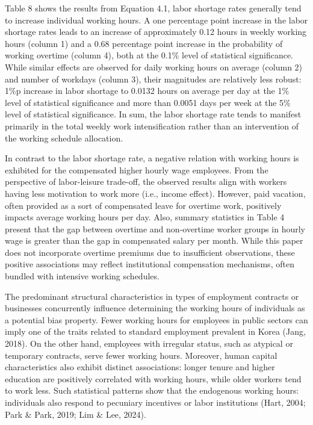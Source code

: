 \documentclass[
  12pt,
]{article}
\begin{document}
Table 8 shows the results from Equation 4.1, labor shortage rates
generally tend to increase individual working hours. A one percentage
point increase in the labor shortage rates leads to an increase of
approximately 0.12 hours in weekly working hours (column 1) and a 0.68
percentage point increase in the probability of working overtime (column
4), both at the 0.1\% level of statistical significance. While similar
effects are observed for daily working hours on average (column 2) and
number of workdays (column 3), their magnitudes are relatively less
robust: 1\%p increase in labor shortage to 0.0132 hours on average per
day at the 1\% level of statistical significance and more than 0.0051
days per week at the 5\% level of statistical significance. In sum, the
labor shortage rate tends to manifest primarily in the total weekly work
intensification rather than an intervention of the working schedule
allocation.

In contrast to the labor shortage rate, a negative relation with working
hours is exhibited for the compensated higher hourly wage employees.
From the perspective of labor-leisure trade-off, the observed results
align with workers having less motivation to work more (i.e., income
effect). However, paid vacation, often provided as a sort of compensated
leave for overtime work, positively impacts average working hours per
day. Also, summary statistics in Table 4 present that the gap between
overtime and non-overtime worker groups in hourly wage is greater than
the gap in compensated salary per month. While this paper does not
incorporate overtime premiums due to insufficient observations, these
positive associations may reflect institutional compensation mechanisms,
often bundled with intensive working schedules.

The predominant structural characteristics in types of employment
contracts or businesses concurrently influence determining the working
hours of individuals as a potential bias property. Fewer working hours
for employees in public sectors can imply one of the traits related to
standard employment prevalent in Korea (Jang, 2018). On the other hand,
employees with irregular status, such as atypical or temporary
contracts, serve fewer working hours. Moreover, human capital
characteristics also exhibit distinct associations: longer tenure and
higher education are positively correlated with working hours, while
older workers tend to work less. Such statistical patterns show that the
endogenous working hours: individuals also respond to pecuniary
incentives or labor institutions (Hart, 2004; Park \& Park, 2019; Lim \&
Lee, 2024).
\end{document}
